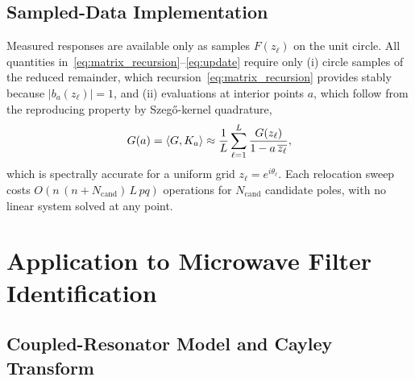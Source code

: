 \documentclass[journal]{IEEEtran}%
\newcommand{\conj}[1]{\overline{#1}}
\newcommand{\inner}[2]{\braket{#1,#2}}
\begin{document}
\subsection{Sampled-Data Implementation}

Measured responses are available only as samples $F(z_\ell)$ on the unit circle. All quantities in~\eqref{eq:matrix_recursion}--\eqref{eq:update} require only (i) circle samples of the reduced remainder, which recursion~\eqref{eq:matrix_recursion} provides stably because $|b_a(z_\ell)| = 1$, and (ii) evaluations at interior points $a$, which follow from the reproducing property by Szeg\H{o}-kernel quadrature,
\begin{equation}\label{eq:quadrature}
  G(a) = \inner{G}{K_a} \approx \frac{1}{L} \sum_{\ell=1}^{L} \frac{G(z_\ell)}{1 - a\,\conj{z_\ell}},
\end{equation}
which is spectrally accurate for a uniform grid $z_\ell = e^{i\theta_\ell}$. Each relocation sweep costs $O\!\left(n\,(n + N_{\mathrm{cand}})\, L\, pq\right)$ operations for $N_{\mathrm{cand}}$ candidate poles, with no linear system solved at any point.

\section{Application to Microwave Filter Identification}\label{sec:filter}

\subsection{Coupled-Resonator Model and Cayley Transform}
\end{document}
